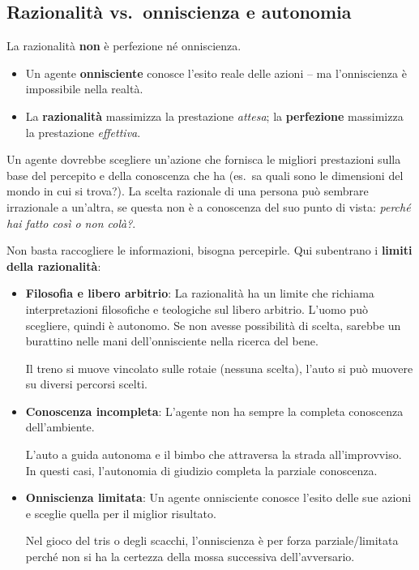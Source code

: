 \subsection{Razionalità vs.\ onniscienza e autonomia}
La razionalità \textbf{non} è perfezione né onniscienza.

\begin{itemize}
    \item Un agente \textbf{onnisciente} conosce l'esito reale delle azioni -- ma l'onniscienza è impossibile nella realtà.
    \item La \textbf{razionalità} massimizza la prestazione \emph{attesa}; la \textbf{perfezione} massimizza la prestazione \emph{effettiva}.
\end{itemize}

Un agente dovrebbe scegliere un'azione che fornisca le migliori prestazioni sulla base del percepito e della conoscenza che ha (es.\ sa quali sono le dimensioni del mondo in cui si trova?). La scelta razionale di una persona può sembrare irrazionale a un'altra, se questa non è a conoscenza del suo punto di vista: \emph{perché hai fatto così o non col\`a?}.

Non basta raccogliere le informazioni, bisogna percepirle. Qui subentrano i \textbf{limiti della razionalità}:

\begin{itemize}
    \item \textbf{Filosofia e libero arbitrio}: La razionalità ha un limite che richiama interpretazioni filosofiche e teologiche sul libero arbitrio. L'uomo può scegliere, quindi è autonomo. Se non avesse possibilità di scelta, sarebbe un burattino nelle mani dell'onnisciente nella ricerca del bene.
    
    \begin{exbox}
        Il treno si muove vincolato sulle rotaie (nessuna scelta), l'auto si può muovere su diversi percorsi scelti.
    \end{exbox}
    
    \item \textbf{Conoscenza incompleta}: L'agente non ha sempre la completa conoscenza dell'ambiente.
    
    \begin{exbox}
        L'auto a guida autonoma e il bimbo che attraversa la strada all'improvviso. In questi casi, l'autonomia di giudizio completa la parziale conoscenza.
    \end{exbox}
    
    \item \textbf{Onniscienza limitata}: Un agente onnisciente conosce l'esito delle sue azioni e sceglie quella per il miglior risultato.
    
    \begin{exbox}
        Nel gioco del tris o degli scacchi, l'onniscienza è per forza parziale/limitata perché non si ha la certezza della mossa successiva dell'avversario.
    \end{exbox}
\end{itemize}

